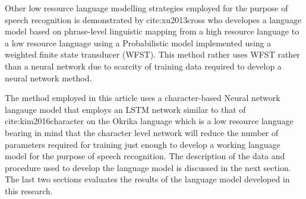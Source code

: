 \documentclass[11pt]{article}
\begin{document}
Other low resource language modelling strategies employed for the purpose of speech recognition is demonstrated by cite:xu2013cross who developes a language model based on phrase-level linguistic mapping from a high resource language to a low resource language using a Probabilistic model implemented using a weighted finite state transducer (WFST). This method rather uses WFST rather than a neural network due to scarcity of training data required to develop a neural network method.

The method employed in this article uses a character-based Neural network langauge model that employs an LSTM network similar to that of cite:kim2016character on the Okrika language which is a low resource language bearing in mind that the character level network will reduce the number of parameters required for training just enough to develop a working language model for the purpose of speech recognition.  The description of the data and procedure used to develop the language model is discussed in the next section.  The last two sections evaluates the results of the language model developed in this research.
\end{document}
